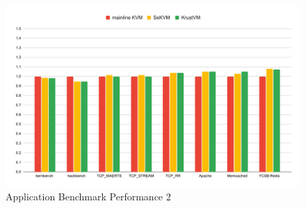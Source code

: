 \begin{figure}[hbtp]
    \includegraphics[scale=0.45]{figures/eval2.pdf}
    \caption{Application Benchmark Performance 2}
    \label{fig:eval2}
\end{figure}
